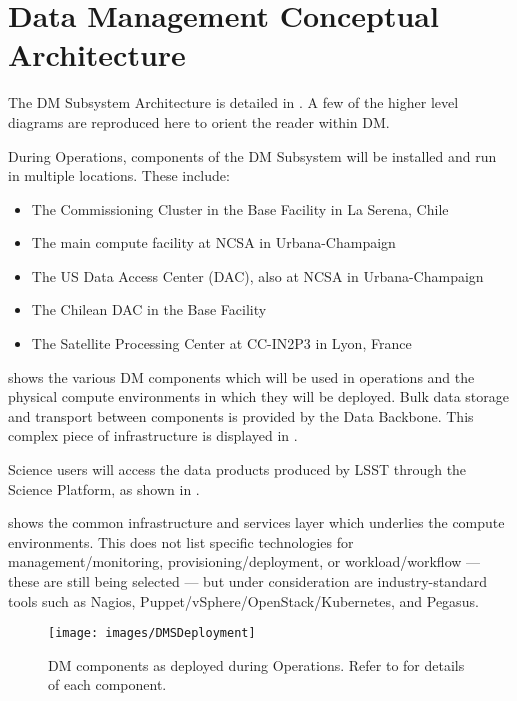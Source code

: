 \section{Data Management Conceptual Architecture \label{sect:dmarc}}

The \gls{DM} \gls{Subsystem} Architecture is detailed in .
A few of the higher level diagrams are reproduced here to orient the reader within \gls{DM}.

During \gls{Operations}, components of the \gls{DM} \gls{Subsystem} will be installed and run in
multiple locations. These include:

\begin{itemize}
\item The \gls{Commissioning} Cluster in the \gls{Base Facility} in La Serena, Chile
\item The main compute facility at \gls{NCSA} in Urbana-Champaign
\item The \gls{US} \gls{Data Access Center} (\gls{DAC}), also at \gls{NCSA} in Urbana-Champaign
\item The Chilean \gls{DAC} in the \gls{Base Facility}
\item The Satellite Processing \gls{Center} at \gls{CC}-IN2P3 in Lyon, France
\end{itemize}

 shows the various \gls{DM} components which will be used in operations and the physical compute environments in which they will be deployed.
Bulk data storage and transport between components is provided by the \gls{Data Backbone}. This complex piece of infrastructure is displayed in .

Science users will access the data products produced by \gls{LSST} through the
Science Platform, as shown in .

 shows the common infrastructure and services layer which underlies the compute environments.
This does not list specific technologies for management/monitoring, provisioning/deployment, or workload/workflow --- these are still being selected --- but under consideration are industry-standard tools such as Nagios, Puppet/vSphere/OpenStack/Kubernetes, and Pegasus.

\begin{figure}[htbp]
\begin{center}
\texttt{[image: images/DMSDeployment]}
\caption{DM components as deployed during \gls{Operations}. Refer to  for details of each component.}
\label{fig:dmsdeploy}
\end{center}
\end{figure}

